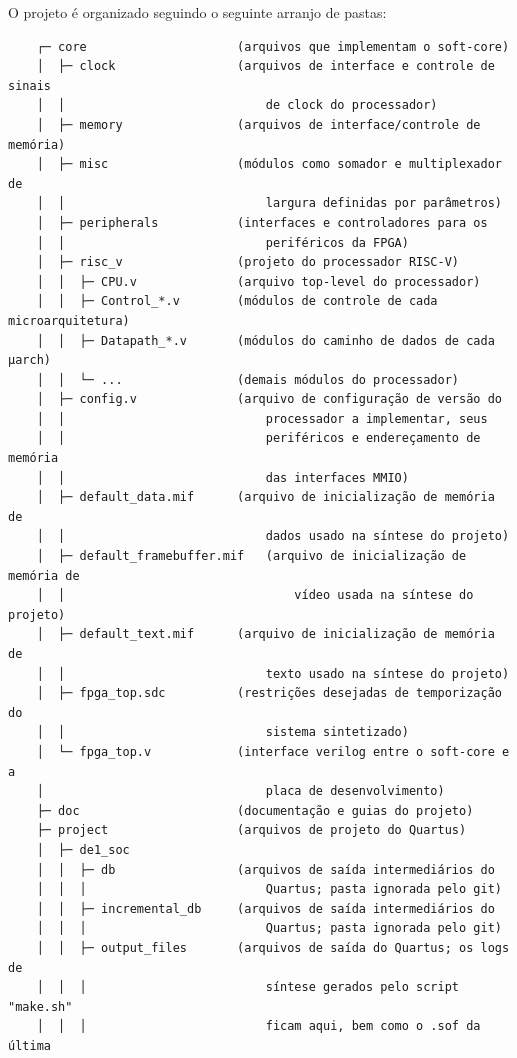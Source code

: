 { O projeto é organizado seguindo o seguinte arranjo de pastas:
\begin{verbatim}
    ┌─ core                     (arquivos que implementam o soft-core)
    │  ├─ clock                 (arquivos de interface e controle de sinais
    │  │                            de clock do processador)
    │  ├─ memory                (arquivos de interface/controle de memória)
    │  ├─ misc                  (módulos como somador e multiplexador de
    │  │                            largura definidas por parâmetros)
    │  ├─ peripherals           (interfaces e controladores para os
    │  │                            periféricos da FPGA)
    │  ├─ risc_v                (projeto do processador RISC-V)
    │  │  ├─ CPU.v              (arquivo top-level do processador)
    │  │  ├─ Control_*.v        (módulos de controle de cada microarquitetura)
    │  │  ├─ Datapath_*.v       (módulos do caminho de dados de cada µarch)
    │  │  └─ ...                (demais módulos do processador)
    │  ├─ config.v              (arquivo de configuração de versão do
    │  │                            processador a implementar, seus
    │  │                            periféricos e endereçamento de memória
    │  │                            das interfaces MMIO)
    │  ├─ default_data.mif      (arquivo de inicialização de memória de
    │  │                            dados usado na síntese do projeto)
    │  ├─ default_framebuffer.mif   (arquivo de inicialização de memória de
    │  │                                vídeo usada na síntese do projeto)
    │  ├─ default_text.mif      (arquivo de inicialização de memória de
    │  │                            texto usado na síntese do projeto)
    │  ├─ fpga_top.sdc          (restrições desejadas de temporização do
    │  │                            sistema sintetizado)
    │  └─ fpga_top.v            (interface verilog entre o soft-core e a
    │                               placa de desenvolvimento)
    ├─ doc                      (documentação e guias do projeto)
    ├─ project                  (arquivos de projeto do Quartus)
    │  ├─ de1_soc
    │  │  ├─ db                 (arquivos de saída intermediários do
    │  │  │                         Quartus; pasta ignorada pelo git)
    │  │  ├─ incremental_db     (arquivos de saída intermediários do
    │  │  │                         Quartus; pasta ignorada pelo git)
    │  │  ├─ output_files       (arquivos de saída do Quartus; os logs de
    │  │  │                         síntese gerados pelo script "make.sh"
    │  │  │                         ficam aqui, bem como o .sof da última

\end{verbatim}}
